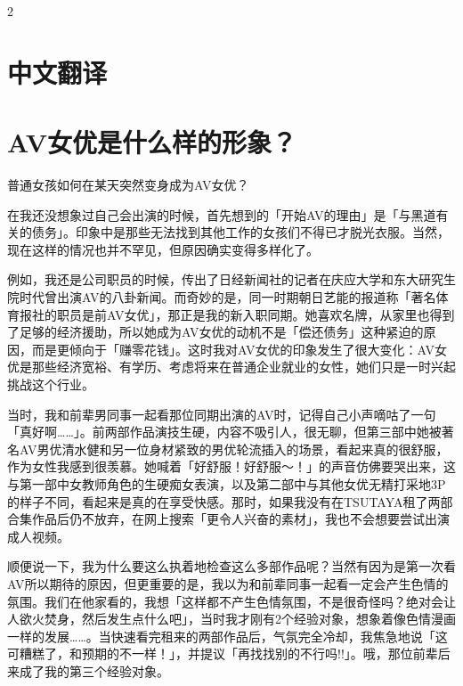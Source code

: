 \documentclass[12pt,UTF8]{ctexbook}
\begin{document}
\begin{paracol}{2}
\switchcolumn

\section*{中文翻译}

\section{AV女优是什么样的形象？}

普通女孩如何在某天突然变身成为AV女优？

在我还没想象过自己会出演的时候，首先想到的「开始AV的理由」是「与黑道有关的债务」。印象中是那些无法找到其他工作的女孩们不得已才脱光衣服。当然，现在这样的情况也并不罕见，但原因确实变得多样化了。

例如，我还是公司职员的时候，传出了日经新闻社的记者在庆应大学和东大研究生院时代曾出演AV的八卦新闻。而奇妙的是，同一时期朝日艺能的报道称「著名体育报社的职员是前AV女优」，那正是我的新入职同期。她喜欢名牌，从家里也得到了足够的经济援助，所以她成为AV女优的动机不是「偿还债务」这种紧迫的原因，而是更倾向于「赚零花钱」。这时我对AV女优的印象发生了很大变化：AV女优是那些经济宽裕、有学历、考虑将来在普通企业就业的女性，她们只是一时兴起挑战这个行业。

当时，我和前辈男同事一起看那位同期出演的AV时，记得自己小声嘀咕了一句「真好啊……」。前两部作品演技生硬，内容不吸引人，很无聊，但第三部中她被著名AV男优清水健和另一位身材紧致的男优轮流插入的场景，看起来真的很舒服，作为女性我感到很羡慕。她喊着「好舒服！好舒服～！」的声音仿佛要哭出来，这与第一部中女教师角色的生硬痴女表演，以及第二部中与其他女优无精打采地3P的样子不同，看起来是真的在享受快感。那时，如果我没有在TSUTAYA租了两部合集作品后仍不放弃，在网上搜索「更令人兴奋的素材」，我也不会想要尝试出演成人视频。

顺便说一下，我为什么要这么执着地检查这么多部作品呢？当然有因为是第一次看AV所以期待的原因，但更重要的是，我以为和前辈同事一起看一定会产生色情的氛围。我们在他家看的，我想「这样都不产生色情氛围，不是很奇怪吗？绝对会让人欲火焚身，然后发生点什么吧」，当时我才刚有2个经验对象，想象着像色情漫画一样的发展……。当快速看完租来的两部作品后，气氛完全冷却，我焦急地说「这可糟糕了，和预期的不一样！」，并提议「再找找别的不行吗!!」。哦，那位前辈后来成了我的第三个经验对象。

\end{paracol}
\end{document}
